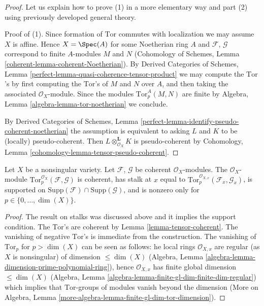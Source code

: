 \begin{proof}
Let us explain how to prove (1) in a more elementary way and part (2)
using previously developed general theory.

\medskip\noindent
Proof of (1). Since formation of $\text{Tor}$ commutes with localization
we may assume $X$ is affine. Hence $X = \Spec(A)$ for some Noetherian
ring $A$ and $\mathcal{F}$, $\mathcal{G}$ correspond to finite $A$-modules
$M$ and $N$ (Cohomology of Schemes, Lemma
\ref{coherent-lemma-coherent-Noetherian}).
By Derived Categories of Schemes, Lemma
\ref{perfect-lemma-quasi-coherence-tensor-product} we may
compute the $\text{Tor}$'s by first computing the $\text{Tor}$'s
of $M$ and $N$ over $A$, and then taking the associated $\mathcal{O}_X$-module.
Since the modules $\text{Tor}_p^A(M, N)$ are finite by
Algebra, Lemma \ref{algebra-lemma-tor-noetherian}
we conclude.

\medskip\noindent
By Derived Categories of Schemes, Lemma
\ref{perfect-lemma-identify-pseudo-coherent-noetherian}
the assumption is equivalent to asking $L$ and $K$ to be
(locally) pseudo-coherent. Then $L \otimes_{\mathcal{O}_X}^\mathbf{L} K$
is pseudo-coherent by
Cohomology, Lemma \ref{cohomology-lemma-tensor-pseudo-coherent}.
\end{proof}

\begin{lemma}
\label{lemma-compute-tor-nonsingular}
Let $X$ be a nonsingular variety.
Let $\mathcal{F}$, $\mathcal{G}$ be coherent $\mathcal{O}_X$-modules.
The $\mathcal{O}_X$-module
$\text{Tor}_p^{\mathcal{O}_X}(\mathcal{F}, \mathcal{G})$
is coherent, has stalk at $x$ equal to
$\text{Tor}_p^{\mathcal{O}_{X, x}}(\mathcal{F}_x, \mathcal{G}_x)$,
is supported on
$\text{Supp}(\mathcal{F}) \cap \text{Supp}(\mathcal{G})$, and
is nonzero only for $p \in \{0, \ldots, \dim(X)\}$.
\end{lemma}

\begin{proof}
The result on stalks was discussed above and it implies the support
condition. The $\text{Tor}$'s are coherent by
Lemma \ref{lemma-tensor-coherent}. The vanishing of negative
$\text{Tor}$'s is immediate from the construction. The
vanishing of $\text{Tor}_p$ for $p > \dim(X)$ can be seen as follows:
he local rings $\mathcal{O}_{X, x}$ are regular
(as $X$ is nonsingular) of dimension $\leq \dim(X)$
(Algebra, Lemma \ref{algebra-lemma-dimension-prime-polynomial-ring}),
hence $\mathcal{O}_{X, x}$ has finite global dimension $\leq \dim(X)$
(Algebra, Lemma \ref{algebra-lemma-finite-gl-dim-finite-dim-regular})
which implies that $\text{Tor}$-groups of modules vanish beyond the dimension
(More on Algebra, Lemma \ref{more-algebra-lemma-finite-gl-dim-tor-dimension}).
\end{proof}

